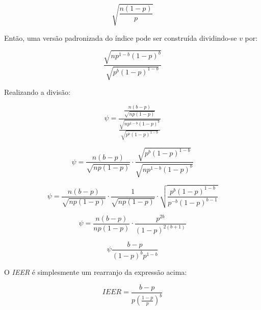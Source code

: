 \documentclass[12pt]{article}
\begin{document}
\begin{equation}
    \sqrt{\frac{n\left(1 - p\right)}{p}}
\end{equation}

\par Então, uma versão padronizada do índice pode ser construída dividindo-se $v$ por:

\begin{equation}
    \frac{\sqrt{n p^{1 - b} \left(1 - p\right)^{b}}}{\sqrt{p^{b} \left(1 - p\right)^{1 - b}}}
\end{equation}

\par Realizando a divisão:

\begin{equation}
    \psi = \frac{\frac{n(b-p)}{\sqrt{n p \left(1 - p\right)}}}{\frac{\sqrt{n p^{1 - b} \left(1 - p\right)^{b}}}{\sqrt{p^{b} \left(1 - p\right)^{1 - b}}}}
\end{equation}

\begin{equation}
    \psi = \frac{n(b-p)}{\sqrt{n p \left(1 - p\right)}} \cdot \frac{\sqrt{p^{b} \left(1 - p\right)^{1 - b}}}{\sqrt{n p^{1 - b} \left(1 - p\right)^{b}}}
\end{equation}


\begin{equation}
    \psi = \frac{n(b-p)}{\sqrt{n p \left(1 - p\right)}} \cdot \frac{1}{\sqrt{n p(1-p)}} \cdot \sqrt{\frac{p^{b}(1 - p)^{1 - b}}{p^{-b}(1 - p)^{b-1}}}
\end{equation}

\begin{equation}
    \psi = \frac{n(b-p)}{n p \left(1 - p\right)} \cdot \frac{p^{2b}}{(1-p)^{2(b+1)}}
\end{equation}

\begin{equation}
    \psi \frac{b-p}{(1-p)^{b}p^{1-b}}
\end{equation}

\par O \textit{IEER} é simplesmente um rearranjo da expressão acima:

\begin{equation}
    IEER = \frac{b-p}{p \left(\frac{1-p}{p}\right)^{b}}
\end{equation}

\clearpage

\printbibliography[title={Bibliografia}, nottype=misc]
\end{document}
